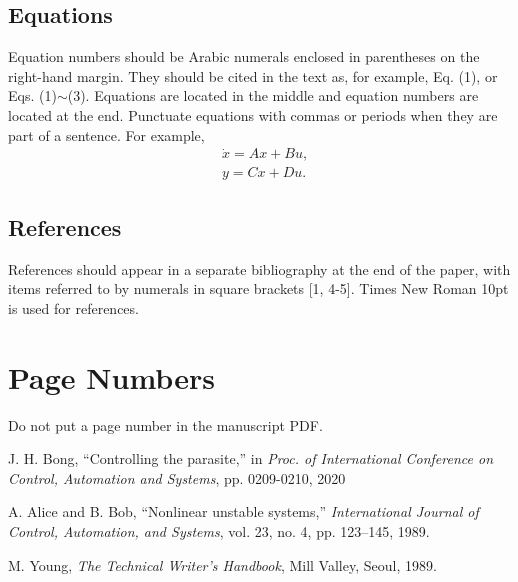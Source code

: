 \documentclass[10pt,twocolumn]{ICCAS}
\begin{document}
\subsection{Equations}
Equation numbers should be Arabic numerals enclosed in parentheses
on the right-hand margin. They should be cited in the text as, for
example, Eq. (1), or Eqs. (1)$\sim$(3). Equations are located in the middle and equation numbers are located at the end. Punctuate equations with commas or periods when
they are part of a sentence. For example,
\begin{align}
&\dot{x} =  Ax+Bu, \label{eq.1}\\
&y  =  Cx+Du. \label{eq.2}
\end{align}
 
\subsection{References} References should appear in a separate
bibliography at the end of the paper, with items referred to by
numerals in square brackets [1, 4-5]. Times New Roman 10pt is used
for references.

\section{Page Numbers}
Do not put a page number in the manuscript PDF.



%


%
\begin{thebibliography}{99}

J. H. Bong, ``Controlling the parasite,'' in \textit{Proc. of International Conference on Control, Automation and Systems}, pp. 0209-0210, 2020


A. Alice and B. Bob, ``Nonlinear unstable systems,'' \textit{International Journal of Control, Automation, and Systems}, vol. 23, no. 4, pp. 123–145, 1989.

M. Young, \textit{The Technical Writer's Handbook}, Mill Valley, Seoul, 1989.



\end{thebibliography}
%
\end{document}
